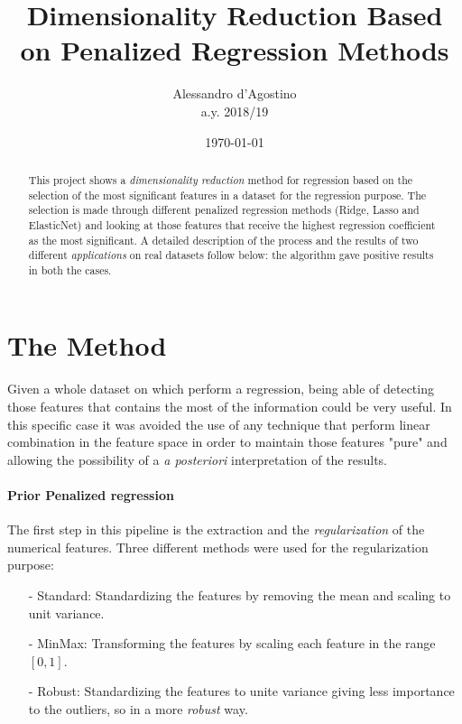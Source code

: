 \documentclass{article}
\title{Dimensionality Reduction Based on Penalized Regression Methods}
\author{Alessandro d'Agostino \\
		a.y. 2018/19 \\
	}
\date{\today}
\begin{document}
\maketitle

\begin{abstract}
	This project shows a \emph{dimensionality reduction} method for regression based on the selection of the most significant features in a dataset for the regression purpose. The selection is made through different penalized regression methods (Ridge, Lasso and ElasticNet) and looking at those features that receive the highest regression coefficient as the most significant.
	A detailed description of the process and the results of two different \emph{applications} on real datasets follow below: the algorithm gave positive results in both the cases.
\end{abstract}

\section*{The Method}
Given a whole dataset on which perform a regression, being able of detecting those features that contains the most of the information could be very useful. In this specific case it was avoided the use of any technique that perform linear combination in the feature space in order to maintain those features "pure" and allowing the possibility of a \emph{a posteriori} interpretation of the results.

\paragraph{Prior Penalized regression}

The first step in this pipeline is the extraction and the \emph{regularization} of the numerical features. Three different methods were used for the regularization purpose:

\begin{itemize}
\item [-] Standard: Standardizing the features by removing the mean and scaling to unit variance.
\item [-] MinMax: Transforming the features by scaling each feature in the range $[0,1]$.
\item [-] Robust: Standardizing the features to unite variance giving less importance to the outliers, so in a more \emph{robust} way.

\end{itemize}
\end{document}
